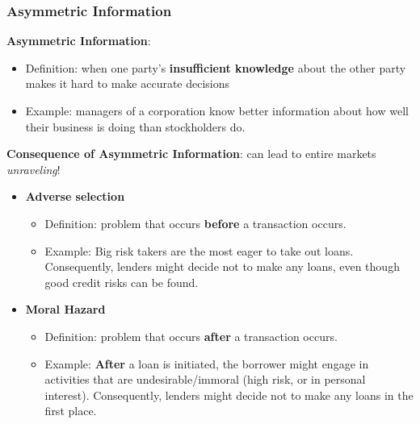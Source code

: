 \documentclass[aspectratio=169]{beamer}
\begin{document}
\begin{frame}
\frametitle{Asymmetric Information}
\vspace{-2mm}
\textbf{Asymmetric Information}: 
\begin{itemize}
    \item Definition: when one party’s \textbf{insufficient knowledge} about the other party makes it hard to make accurate decisions
    \item Example: managers of a corporation know better information about how well their business is doing than stockholders do. \pause 
\end{itemize}

\textbf{Consequence of Asymmetric Information}: can lead to entire markets \emph{unraveling}! 
\begin{itemize}
    \item \textbf{Adverse selection}
    \begin{itemize}
        \item Definition: problem that occurs \textbf{before} a transaction occurs.
        \item Example: Big risk takers are the most eager to take out loans. Consequently, lenders might decide not to make any loans, even though good credit risks can be found. \pause 
    \end{itemize}
    \item \textbf{Moral Hazard}
    \begin{itemize}
        \item Definition: problem that occurs \textbf{after} a transaction occurs.
        \item Example: \textbf{After} a loan is initiated, the borrower might engage in activities that are undesirable/immoral (high risk, or in personal interest). Consequently, lenders might decide not to make any loans in the first place.
    \end{itemize}
\end{itemize}

\vspace{-6mm}



\end{frame}
\end{document}
